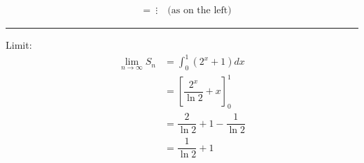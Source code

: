 \documentclass[a4paper,11pt]{book}
\begin{document}
{\begin{wschgblock}
\begin{minipage}[t]{0.41\textwidth}
\begin{align*}
&= \ \vdots \quad \text{(as on the left)}
\end{align*}
\par\medskip\hrule\par\medskip\normalsize
Limit:\vspace{-3mm}
\begin{align*}
\lim_{n\to\infty} S_n &= \int_0^1 \left(2^x + 1\right) dx \\
&= \left[\dfrac{2^x}{\ln 2} + x\right]_0^1 \\
&= \dfrac{2}{\ln 2} + 1 - \dfrac{1}{\ln 2} \\
&= \dfrac{1}{\ln 2} + 1
\end{align*}
\end{minipage}\par
\end{wschgblock}
}
\end{document}
